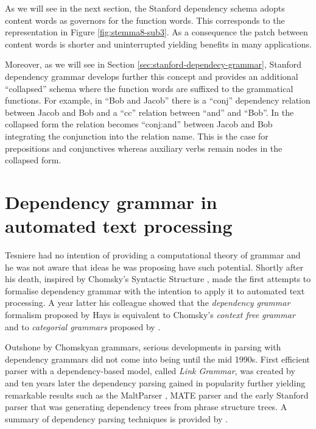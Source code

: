    As we will see in the next section, the Stanford dependency schema \citep{Marneffe2008,Marneffe2008a} adopts content words as governors for the function words. This corresponds to the representation in Figure \ref{fig:stemma8-sub3}. As a consequence the patch between content words is shorter and uninterrupted yielding benefits in many applications.
    
    Moreover, as we will see in Section \ref{sec:stanford-dependecy-grammar}, Stanford dependency grammar develops further this concept and provides an additional ``collapsed'' schema where the function words are suffixed to the grammatical functions. For example, in ``Bob and Jacob'' there is a ``conj'' dependency relation between Jacob and Bob and a ``cc'' relation between ``and'' and ``Bob''. In the collapsed form the relation becomes ``conj:and'' between Jacob and Bob integrating the conjunction into the relation name. This is the case for prepositions and conjunctives whereas auxiliary verbs remain nodes in the collapsed form. 

\section{Dependency grammar in automated text processing}
    Tesniere had no intention of providing a computational theory of grammar and he was not aware that ideas he was proposing have such potential. Shortly after his death, inspired by Chomsky's Syntactic Structure \citep{Chomsky57}, \citet{Hays1960,Hays1964} made the first attempts to formalise dependency grammar with the intention to apply it to automated text processing. A year latter his colleague \citet{Gaifman1965} showed that the \textit{dependency grammar} formalism proposed by Hays is equivalent to Chomsky's \textit{context free grammar} and to \textit{categorial grammars} proposed by \citet{BarHillel53}.

    Outshone by Chomskyan grammars, serious developments in parsing with dependency grammars did not come into being until the mid 1990s. First efficient parser with a dependency-based model, called \textit{Link Grammar}, was created by \citet{sleator1995parsing} and ten years later the dependency parsing gained in popularity further yielding remarkable results such as the MaltParser \citep{Nivre2006,Nivre2007parser}, MATE parser \citep{Bohnet2010} and the early Stanford parser \citep{Marneffe2006} that was generating dependency trees from phrase structure trees. A summary of dependency parsing techniques is provided by \citet{kubler2009dependency}.

